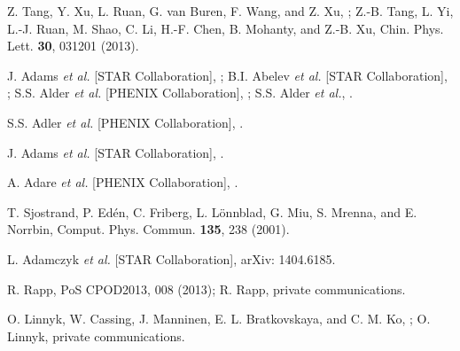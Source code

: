 \documentclass[twocolumn,showpacs,amsmath,amssymb,superscriptaddress,nofootinbib]{revtex4-1}
\begin{document}
\begin{thebibliography}{999}


 Z. Tang, Y. Xu, L. Ruan, G. van Buren, F. Wang, and Z. Xu, ; Z.-B. Tang, L. Yi,
L.-J. Ruan, M. Shao, C. Li, H.-F. Chen, B. Mohanty, and
Z.-B. Xu, {Chin. Phys. Lett.} {\bf{30}}, 031201 (2013).

 J. Adams {\it et al.} [STAR Collaboration], ; B.I. Abelev {\it et al.} [STAR Collaboration], ; S.S. Alder {\it et al.} [PHENIX Collaboration], ; S.S. Alder {\it et al.}, .




 S.S. Adler {\it et al.} [PHENIX Collaboration], .

 J. Adams {\it et al.} [STAR Collaboration], .

 A. Adare {\it et al.} [PHENIX Collaboration], .

  T. Sjostrand, P. Edén, C. Friberg, L. Lönnblad, G. Miu, S. Mrenna, and E. Norrbin, {Comput. Phys. Commun.} {\bf{135}}, 238 (2001).

 L. Adamczyk {\it et al.} [STAR Collaboration], arXiv: 1404.6185.


 R. Rapp, PoS CPOD2013, 008 (2013); R. Rapp, private communications.

 O. Linnyk, W. Cassing, J. Manninen, E. L. Bratkovskaya, and C. M. Ko, ; O. Linnyk, private communications.


\end{thebibliography}
\end{document}
